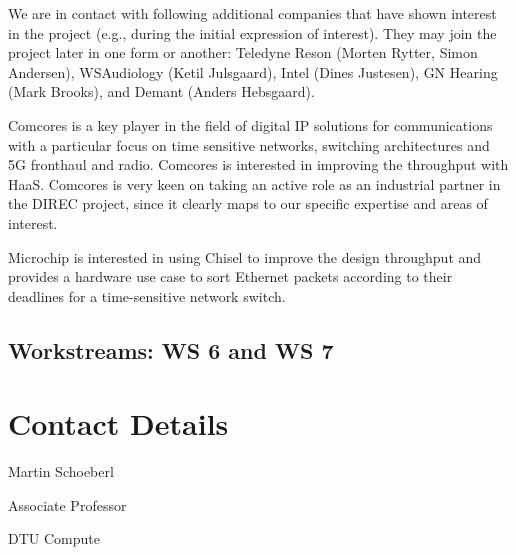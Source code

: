 \documentclass[fleqn,12pt]{article}
\begin{document}


We are in contact with following additional companies that have shown interest in
the project (e.g., during the initial expression of interest).
They may join the project later in one form or another:
Teledyne Reson (Morten Rytter, Simon Andersen), WSAudiology (Ketil Julsgaard),
Intel (Dines Justesen), GN Hearing (Mark Brooks), and Demant (Anders Hebsgaard).


Comcores is a key player in the field of digital IP solutions for communications with a particular focus on time sensitive networks, switching architectures and 5G fronthaul and radio.
Comcores is interested in improving the throughput with HaaS.
Comcores is very keen on taking an active role as an industrial partner in the DIREC project, since it clearly maps to our specific expertise and areas of interest.

Microchip is interested in using Chisel to improve the design throughput and
provides a hardware use case to sort Ethernet packets according to their deadlines
for a time-sensitive network switch.
%
%


%


\subsection*{Workstreams: WS 6 and WS 7}


\section*{Contact Details}

Martin Schoeberl

\noindent Associate Professor

\bigskip

\noindent DTU Compute
\end{document}
